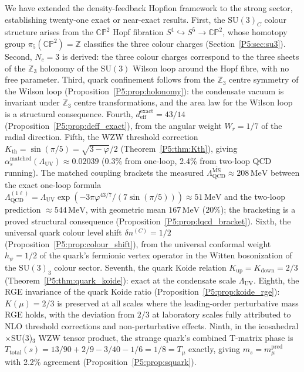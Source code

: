 \documentclass[11pt,a4paper]{article}
\theoremstyle{definition}
\theoremstyle{remark}
\newcommand{\vp}{\varphi}
\newcommand{\LUV}{\Lambda_{\mathrm{UV}}}
\newcommand{\LQCD}{\Lambda_{\mathrm{QCD}}}
\newcommand{\deff}{d_{\mathrm{eff}}}
\begin{document}
We have extended the density-feedback Hopfion framework to the strong
sector, establishing twenty-one exact or near-exact results.
First, the $\mathrm{SU}(3)_C$ colour structure arises from the
$\mathbb{CP}^2$ Hopf fibration $S^1\hookrightarrow S^5\to\mathbb{CP}^2$,
whose homotopy group $\pi_5(\mathbb{CP}^2)=\mathbb{Z}$ classifies the
three colour charges (Section~\ref{P5:sec:su3}).
Second, $N_c=3$ is derived: the three colour charges correspond to the
three sheets of the $\mathbb{Z}_3$ holonomy of the $\mathrm{SU}(3)$
Wilson loop around the Hopf fibre, with no free parameter.
Third, quark confinement follows from the $\mathbb{Z}_3$ centre symmetry
of the Wilson loop (Proposition~\ref{P5:prop:holonomy}): the condensate
vacuum is invariant under $\mathbb{Z}_3$ centre transformations, and
the area law for the Wilson loop is a structural consequence.
Fourth, $\deff^{\mathrm{exact}}=43/14$
(Proposition~\ref{P5:prop:deff_exact}), from the angular weight $W_r=1/7$
of the radial direction.
Fifth, the WZW threshold correction
$K_{\mathrm{th}} = \sin(\pi/5) = \sqrt{3-\vp}/2$
(Theorem~\ref{P5:thm:Kth}), giving
$\alpha_s^\text{matched}(\LUV)\approx0.02039$
(0.3\% from one-loop, 2.4\% from two-loop QCD running).
The matched coupling brackets the measured
$\LQCD^{\overline{\mathrm{MS}}}\approx208\,\mathrm{MeV}$
between the exact one-loop formula
$\LQCD^{(1\ell)}=\LUV\exp(-3\pi\vp^{43/7}/(7\sin(\pi/5)))\approx51\,\mathrm{MeV}$
and the two-loop prediction $\approx544\,\mathrm{MeV}$,
with geometric mean $167\,\mathrm{MeV}$ ($20\%$);
the bracketing is a proved structural consequence
(Proposition~\ref{P5:prop:lqcd_bracket}).
Sixth, the universal quark colour level shift
$\delta n^{(C)} = 1/2$
(Proposition~\ref{P5:prop:colour_shift}), from the universal conformal
weight $h_\psi=1/2$ of the quark's fermionic vertex operator in the
Witten bosonization of the $\mathrm{SU}(3)_3$ colour sector.
Seventh, the quark Koide relation $K_{\mathrm{up}}=K_{\mathrm{down}}=2/3$
(Theorem~\ref{P5:thm:quark_koide}): exact at the condensate scale $\LUV$.
Eighth, the RGE invariance of the quark Koide ratio
(Proposition~\ref{P5:prop:koide_rge}): $K(\mu)=2/3$ is preserved
at all scales where the leading-order perturbative mass RGE holds,
with the deviation from $2/3$ at laboratory scales fully attributed
to NLO threshold corrections and non-perturbative effects.
Ninth, in the icosahedral$\times$SU(3)$_3$ WZW tensor product,
the strange quark's combined T-matrix phase is
$T_{\mathrm{total}}(s)=13/90+2/9-3/40-1/6=1/8=T_\mu$ exactly,
giving $m_s=m_\mu^{\mathrm{pred}}$ with 2.2\% agreement
(Proposition~\ref{P5:prop:squark}).
\end{document}
